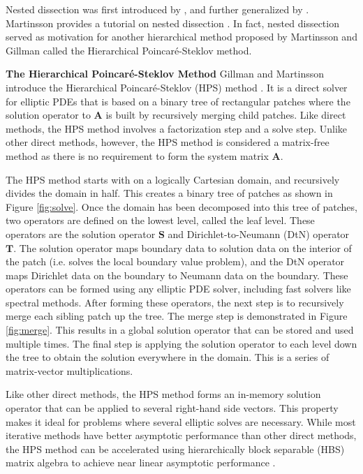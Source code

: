 Nested dissection was first introduced by \cite{george1973nested}, and further generalized by \cite{lipton1979generalized}. Martinsson provides a tutorial on nested dissection \citep{martinsson2019fast}. In fact, nested dissection served as motivation for another hierarchical method proposed by Martinsson and Gillman called the Hierarchical Poincaré-Steklov method.


{\bf The Hierarchical Poincaré-Steklov Method}
Gillman and Martinsson introduce the Hierarchical Poincaré-Steklov (HPS) method \citep{martinsson2004fast, MARTINSSON2013460, gillman2014direct, martinsson2015hierarchical}. It is a direct solver for elliptic PDEs that is based on a binary tree of rectangular patches where the solution operator to $\textbf{A}$ is built by recursively merging child patches. Like direct methods, the HPS method involves a factorization step and a solve step. Unlike other direct methods, however, the HPS method is considered a matrix-free method as there is no requirement to form the system matrix $\textbf{A}$.

The HPS method starts with on a logically Cartesian domain, and recursively divides the domain in half. This creates a binary tree of patches as shown in Figure \ref{fig:solve}. Once the domain has been decomposed into this tree of patches, two operators are defined on the lowest level, called the leaf level. These operators are the solution operator $\textbf{S}$ and Dirichlet-to-Neumann (DtN) operator $\textbf{T}$. The solution operator maps boundary data to solution data on the interior of the patch (i.e. solves the local boundary value problem), and the DtN operator maps Dirichlet data on the boundary to Neumann data on the boundary. These operators can be formed using any elliptic PDE solver, including fast solvers like spectral methods. After forming these operators, the next step is to recursively merge each sibling patch up the tree. The merge step is demonstrated in Figure \ref{fig:merge}. This results in a global solution operator that can be stored and used multiple times. The final step is applying the solution operator to each level down the tree to obtain the solution everywhere in the domain. This is a series of matrix-vector multiplications.

Like other direct methods, the HPS method forms an in-memory solution operator that can be applied to several right-hand side vectors. This property makes it ideal for problems where several elliptic solves are necessary. While most iterative methods have better asymptotic performance than other direct methods, the HPS method can be accelerated using hierarchically block separable (HBS) matrix algebra to achieve near linear asymptotic performance \citep{gillman2014direct}.

